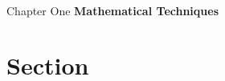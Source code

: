\documentclass[11pt]{article}
\begin{document}
\thispagestyle{empty}
\bigskip \
\vspace{0.1cm}

\begin{center}
{\fontsize{22}{22} \selectfont Chapter One}
\vskip 16pt
{\fontsize{36}{36} \selectfont \bf \sffamily Mathematical Techniques}
\vskip 24pt
\end{center}

{\parindent0pt \baselineskip=15.5pt }

\newpage
\microtoc
\newpage

\section{Section}
\end{document}
